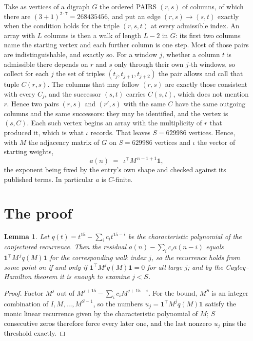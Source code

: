 \documentclass[11pt,a4paper]{article}
\theoremstyle{plain}
\newtheorem{lemma}[theorem]{Lemma}
\theoremstyle{definition}
\begin{document}
Take as vertices of a digraph $G$ the ordered PAIRS $(r,s)$ of columns, of which there are
$(3+1)^{2\cdot7}=268435456$, and put an edge $(r,s)\to(s,t)$ exactly when the condition
holds for the triple $(r,s,t)$ at every admissible index. An array with $L$ columns is then a
walk of length $L-2$ in $G$: its first two columns name the starting vertex and each further
column is one step. Most of those pairs are indistinguishable, and exactly so. For a window $j$, whether a column $t$ is admissible there depends on $r$ and $s$ only through their own $j$-th windows, so collect for each $j$ the set of triples $(t_j,t_{j+1},t_{j+2})$ the pair allows and call that tuple $C(r,s)$. The columns that may follow $(r,s)$ are exactly those consistent with every $C_j$, and the successor $(s,t)$ carries $C(s,t)$, which does not mention $r$. Hence two pairs $(r,s)$ and $(r',s)$ with the same $C$ have the same outgoing columns and the same successors: they may be identified, and the vertex is $(s,C)$. Each such vertex begins an array with the multiplicity of $r$ that produced it, which is what $\iota$ records. That leaves $S=629986$ vertices. Hence, with $M$ the adjacency matrix of $G$ on $S=629986$ vertices and
$\iota$ the vector of starting weights,
\[
a(n)\;=\;\,\iota^{\!\top}M^{\,n-1+1}\mathbf{1},
\]
the exponent being fixed by the entry's own shape and checked against its published terms.
In particular $a$ is $C$-finite.

\section{The proof}

\begin{lemma}\label{lem:crit}
Let $q(t)=t^{15}-\sum_i c_it^{15-i}$ be the characteristic polynomial of the
conjectured recurrence. Then the residual $a(n)-\sum_ic_ia(n-i)$ equals
$\mathbf{1}^{\!\top}M^{\,j}q(M)\mathbf{1}$ for the corresponding walk index
$j$, so the recurrence holds from some point on if and only if
$\mathbf{1}^{\!\top}M^{j}q(M)\mathbf{1}=0$ for all large $j$; and by the
Cayley--Hamilton theorem it is enough to examine $j<S$.
\end{lemma}

\begin{proof}
Factor $M^{j}$ out of $M^{j+15}-\sum_ic_iM^{j+15-i}$. For the bound, $M^{S}$
is an integer combination of $I,M,\dots,M^{S-1}$, so the numbers
$u_j=\mathbf{1}^{\!\top}M^{j}q(M)\mathbf{1}$ satisfy the monic linear recurrence given by
the characteristic polynomial of $M$; $S$ consecutive zeros therefore force every later one,
and the last nonzero $u_j$ pins the threshold exactly.
\end{proof}
\end{document}
